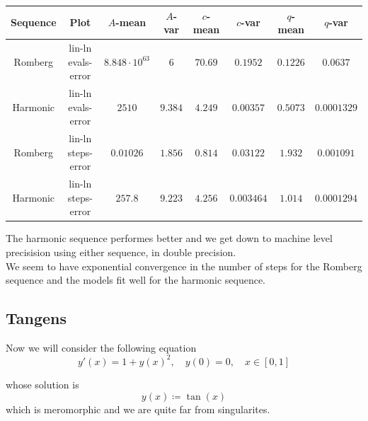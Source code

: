 \begin{table}[H]
    \centering
    \small
     \begin{tabular}{c|c||c|c|c|c|c|c}
Sequence & Plot & \(A\)-mean & \(A\)-var & \(c\)-mean & \(c\)-var & \(q\)-mean & \(q\)-var\\\hline
Romberg & lin-ln evals-error & \(8.848\cdot 10^{63}\) & \(6\) & \(70.69\) & \(0.1952\) & \(0.1226\) & \(0.0637\) \\
Harmonic & lin-ln evals-error & \(2510\) & \(9.384\) & \(4.249\) & \(0.00357\) & \(0.5073\) & \(0.0001329\) \\
Romberg & lin-ln steps-error & \(0.01026\) & \(1.856\) & \(0.814\) & \(0.03122\) & \(1.932\) & \(0.001091\) \\
Harmonic & lin-ln steps-error & \(257.8\) & \(9.223\) & \(4.256\) & \(0.003464\) & \(1.014\) & \(0.0001294\) \\
    \end{tabular}
    \label{tab:my_label}
\end{table}

The harmonic sequence performes better and we get down to machine level precisision using either sequence, in double precision.\\

We seem to have exponential convergence in the number of steps for the Romberg sequence and the models fit well for the harmonic sequence.\\

\subsection{Tangens}

Now we will consider the following equation
\begin{equation}
y'(x) = 1 + y(x)^2, \quad y(0) = 0,\quad x\in [0,1]
\end{equation}

whose solution is 
\[
y(x) \coloneqq \tan(x)
\]
which is meromorphic and we are quite far from singularites.

